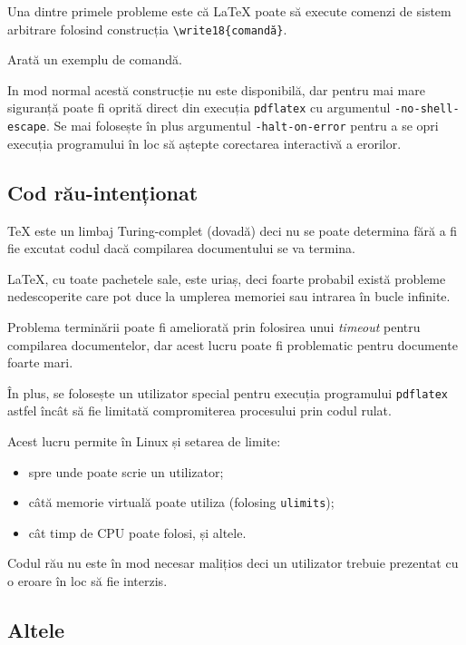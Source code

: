 \documentclass[a4wide,12pt]{report}
\newcommand{\eng}[1]{\emph{#1}} %
\newcommand{\cod}[1]{\texttt{#1}}
\newcommand{\idee}[1]{{\color{red} #1}}
\newcommand{\poate}[1]{#1}
\begin{document}
Una dintre primele probleme este că \LaTeX{} poate să execute comenzi de sistem
arbitrare folosind construcția \cod{\textbackslash write18\{comandă\}}.

\idee{Arată un exemplu de comandă.}

In mod normal acestă construcție nu este disponibilă, dar pentru mai mare
siguranță poate fi oprită direct din execuția \cod{pdflatex} cu argumentul
\cod{-no-shell-escape}. \poate{Se mai folosește în plus argumentul
\cod{-halt-on-error} pentru a se opri execuția programului în loc să aștepte
corectarea interactivă a erorilor.}

\subsection{Cod rău-intenționat}

\TeX{} este un limbaj Turing-complet \idee{(dovadă)} deci nu se poate determina
fără a fi fie excutat codul dacă compilarea documentului se va termina.

\LaTeX{}, cu toate pachetele sale, este uriaș, deci foarte probabil există
probleme nedescoperite care pot duce la umplerea memoriei sau intrarea în bucle
infinite.

Problema terminării poate fi ameliorată prin folosirea unui \eng{timeout} pentru
compilarea documentelor, dar acest lucru poate fi problematic pentru documente
foarte mari.

În plus, se folosește un utilizator special pentru execuția programului
\cod{pdflatex} astfel încât să fie limitată compromiterea procesului prin codul
rulat.

Acest lucru permite în Linux și setarea de limite:

\begin{itemize}

\item spre unde poate scrie un utilizator;

\item câtă memorie virtuală poate utiliza (folosing \cod{ulimits});

\item cât timp de CPU poate folosi, și altele.

\end{itemize}

Codul rău nu este în mod necesar malițios deci un utilizator trebuie prezentat
cu o eroare în loc să fie interzis.

\subsection{Altele}
\end{document}
